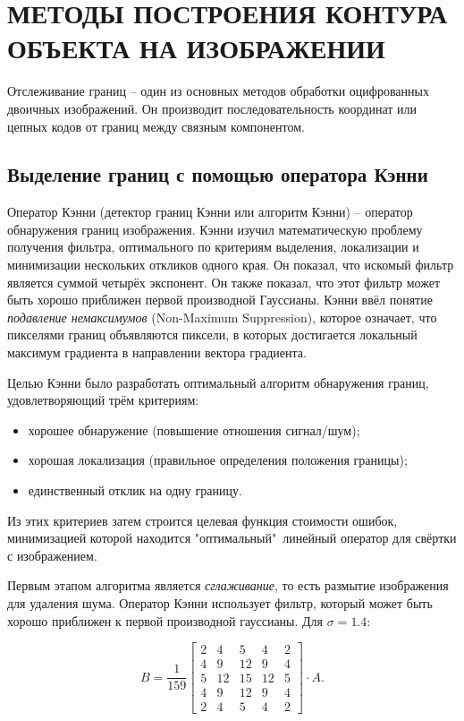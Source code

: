 \section{МЕТОДЫ ПОСТРОЕНИЯ КОНТУРА ОБЪЕКТА НА ИЗОБРАЖЕНИИ}

Отслеживание границ -- один из основных методов обработки оцифрованных
двоичных изображений. Он производит последовательность координат или 
цепных кодов от границ между связным компонентом.

\subsection{Выделение границ с помощью оператора Кэнни}

Оператор Кэнни (детектор границ Кэнни или алгоритм Кэнни) -- оператор
обнаружения границ изображения. Кэнни изучил математическую проблему
получения фильтра, оптимального по критериям выделения, локализации и
минимизации нескольких откликов одного края. Он показал, что искомый
фильтр является суммой четырёх экспонент. Он также показал, что этот
фильтр может быть хорошо приближен первой производной Гауссианы. Кэнни
ввёл понятие {\it подавление немаксимумов} (Non-Maximum Suppression), 
которое означает, что пикселями границ объявляются пиксели, в которых
достигается локальный максимум градиента в направлении вектора
градиента.

Целью Кэнни было разработать оптимальный алгоритм обнаружения границ, 
удовлетворяющий трём критериям:
\begin{itemize}
	\item хорошее обнаружение (повышение отношения сигнал/шум);
	\item хорошая локализация (правильное определения положения
границы);
	\item единственный отклик на одну границу.
\end{itemize}

Из этих критериев затем строится целевая функция стоимости ошибок, 
минимизацией которой находится "оптимальный"\ линейный оператор для
свёртки с изображением.

Первым этапом алгоритма является {\it сглаживание}, то есть размытие
изображения для удаления шума. Оператор Кэнни использует фильтр, 
который может быть хорошо приближен к первой производной гауссианы.
Для $\sigma=1.4$:

\begin{equation}
	B = \frac{1}{159}
\begin{bmatrix}
	2 & 4 & 5 & 4 & 2\\
	4 & 9 & 12 & 9 & 4\\
	5 & 12 & 15 & 12 & 5\\
	4 & 9 & 12 & 9 & 4\\
	2 & 4 & 5 & 4 & 2
\end{bmatrix}
\cdot A.
\label{canny-1}
\end{equation}

